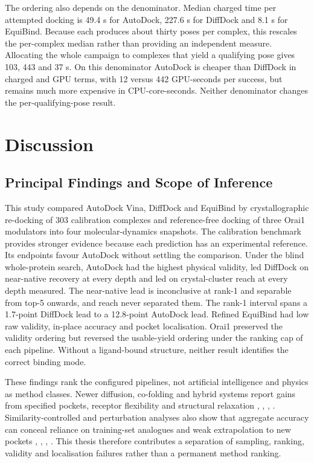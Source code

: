 The ordering also depends on the denominator. Median charged time per attempted docking is 49.4 s for AutoDock, 227.6 s for DiffDock and 8.1 s for EquiBind. Because each produces about thirty poses per complex, this rescales the per-complex median rather than providing an independent measure. Allocating the whole campaign to complexes that yield a qualifying pose gives 103, 443 and 37 s. On this denominator AutoDock is cheaper than DiffDock in charged and GPU terms, with 12 versus 442 GPU-seconds per success, but remains much more expensive in CPU-core-seconds. Neither denominator changes the per-qualifying-pose result.

\hypertarget{discussion}{%
\chapter{\texorpdfstring{Discussion }{Discussion }}\label{discussion}}

\hypertarget{principal-findings-and-scope-of-inference}{%
\section{Principal Findings and Scope of Inference}\label{principal-findings-and-scope-of-inference}}

This study compared AutoDock Vina, DiffDock and EquiBind by crystallographic re-docking of 303 calibration complexes and reference-free docking of three Orai1 modulators into four molecular-dynamics snapshots. The calibration benchmark provides stronger evidence because each prediction has an experimental reference. Its endpoints favour AutoDock without settling the comparison. Under the blind whole-protein search, AutoDock had the highest physical validity, led DiffDock on near-native recovery at every depth and led on crystal-cluster reach at every depth measured. The near-native lead is inconclusive at rank-1 and separable from top-5 onwards, and reach never separated them. The rank-1 interval spans a 1.7-point DiffDock lead to a 12.8-point AutoDock lead. Refined EquiBind had low raw validity, in-place accuracy and pocket localisation. Orai1 preserved the validity ordering but reversed the usable-yield ordering under the ranking cap of each pipeline. Without a ligand-bound structure, neither result identifies the correct binding mode.

These findings rank the configured pipelines, not artificial intelligence and physics as method classes. Newer diffusion, co-folding and hybrid systems report gains from specified pockets, receptor flexibility and structural relaxation \cite{ref012}, \cite{ref031}, \cite{ref064}, \cite{ref069}. Similarity-controlled and perturbation analyses also show that aggregate accuracy can conceal reliance on training-set analogues and weak extrapolation to new pockets \cite{ref035}, \cite{ref063}, \cite{ref065}, \cite{ref069}. This thesis therefore contributes a separation of sampling, ranking, validity and localisation failures rather than a permanent method ranking.

